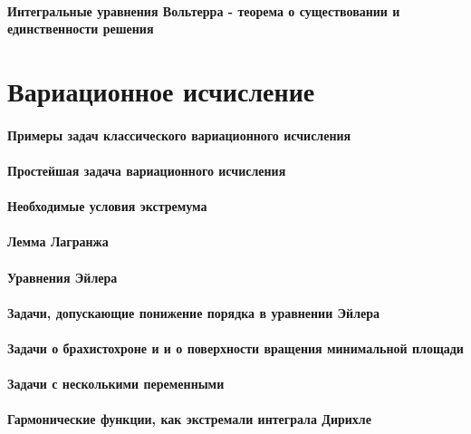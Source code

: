 \documentclass[russian,twocolumn]{article}
\begin{document}
\paragraph{Интегральные уравнения Вольтерра - теорема о существовании и единственности решения}

\section{Вариационное исчисление}

\paragraph{Примеры задач классического вариационного исчисления}

\paragraph{Простейшая задача вариационного исчисления}

\paragraph{Необходимые условия экстремума}

\paragraph{Лемма Лагранжа}

\paragraph{Уравнения Эйлера}

\paragraph{Задачи, допускающие понижение порядка в уравнении Эйлера}

\paragraph{Задачи о брахистохроне и и о поверхности вращения минимальной площади}

\paragraph{Задачи с несколькими переменными}

\paragraph{Гармонические функции, как экстремали интеграла Дирихле}
\end{document}
